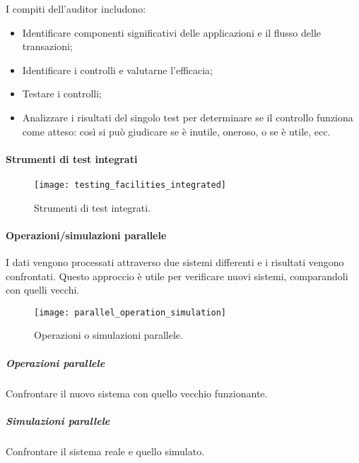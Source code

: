 I compiti dell'auditor includono:
\begin{itemize}
\item Identificare componenti significativi delle applicazioni e 
il flusso delle transazioni;
\item Identificare i controlli e valutarne l'efficacia;
\item Testare i controlli;
\item Analizzare i risultati del singolo test per determinare se 
il controllo funziona come atteso: così si può giudicare se è inutile,
oneroso, o se è utile, ecc.
\end{itemize}

\paragraph*{Strumenti di test integrati}

\begin{figure}[h!]
        \begin{center}
                \texttt{[image: testing\_facilities\_integrated]}
        \end{center}
        \caption{Strumenti di test integrati.}
        \label{fig:testing:facilities:integrated}
\end{figure}

\paragraph*{Operazioni/simulazioni parallele}

I dati vengono processati attraverso due sistemi differenti e i risultati vengono confrontati.
Questo approccio è utile per verificare nuovi sistemi, comparandoli con quelli vecchi.

\begin{figure}[h!]
        \begin{center}
                \texttt{[image: parallel\_operation\_simulation]}
        \end{center}
        \caption{Operazioni o simulazioni parallele.}
        \label{fig:testing:facilities:parallel}
\end{figure}

\subparagraph*{Operazioni parallele}

Confrontare il nuovo sistema con quello vecchio funzionante.

\subparagraph*{Simulazioni parallele}

Confrontare il sistema reale e quello simulato.

